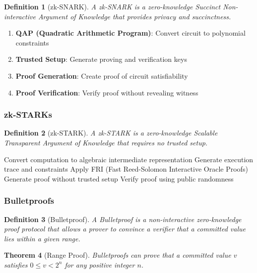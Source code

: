 \documentclass[11pt,a4paper]{article}
\newtheorem{theorem}{Theorem}[section]
\newtheorem{definition}[theorem]{Definition}
\begin{document}
\begin{definition}[zk-SNARK]
A zk-SNARK is a zero-knowledge Succinct Non-interactive Argument of Knowledge that provides privacy and succinctness.
\end{definition}

\begin{enumerate}
\item \textbf{QAP (Quadratic Arithmetic Program)}: Convert circuit to polynomial constraints
\item \textbf{Trusted Setup}: Generate proving and verification keys
\item \textbf{Proof Generation}: Create proof of circuit satisfiability
\item \textbf{Proof Verification}: Verify proof without revealing witness
\end{enumerate}

\subsubsection{zk-STARKs}

\begin{definition}[zk-STARK]
A zk-STARK is a zero-knowledge Scalable Transparent Argument of Knowledge that requires no trusted setup.
\end{definition}

\begin{algorithm}
\caption{zk-STARK Construction}
\begin{algorithmic}[1]
\STATE Convert computation to algebraic intermediate representation
\STATE Generate execution trace and constraints
\STATE Apply FRI (Fast Reed-Solomon Interactive Oracle Proofs)
\STATE Generate proof without trusted setup
\STATE Verify proof using public randomness
\end{algorithmic}
\end{algorithm}

\subsubsection{Bulletproofs}

\begin{definition}[Bulletproof]
A Bulletproof is a non-interactive zero-knowledge proof protocol that allows a prover to convince a verifier that a committed value lies within a given range.
\end{definition}

\begin{theorem}[Range Proof]
Bulletproofs can prove that a committed value $v$ satisfies $0 \leq v < 2^n$ for any positive integer $n$.
\end{theorem}
\end{document}
